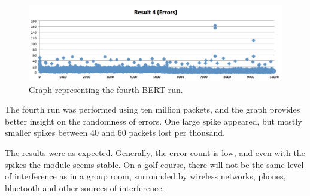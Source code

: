 \begin{figure}[h!]
\hspace*{-2cm}
\includegraphics[width=1.3\textwidth]{chapters/test/figures/res4.png}
\caption{Graph representing the fourth BERT run.}
\label{fig:bert3}
\end{figure}

The fourth run was performed using ten million packets, and the graph provides better insight on the randomness of errors. One large spike appeared, but mostly smaller spikes between 40 and 60 packets lost per thousand.

The results were as expected. Generally, the error count is low, and even with the spikes the module seems stable. On a golf course, there will not be the same level of interference as in a group room, surrounded by wireless networks, phones, bluetooth and other sources of interference.

